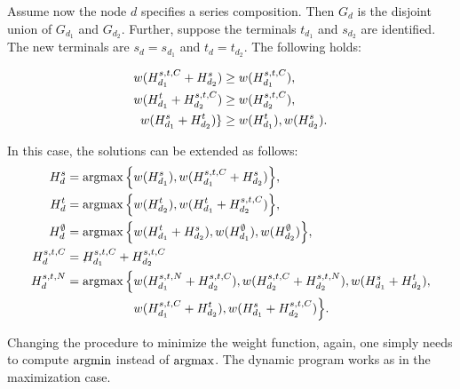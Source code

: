 Assume now the node $d$ specifies a series composition. Then $G_d$ is the disjoint union of $G_{d_1}$ and $G_{d_2}$. Further, suppose the terminals $t_{d_1}$ and $s_{d_2}$ are identified. The new terminals are $s_d = s_{d_1}$ and $t_d = t_{d_2}$. The following holds:

\begin{align}
	\label{equ:spseries}
	\begin{split}
		w(H_{d_1}^{s,t,C} + H_{d_2}^{s}) &\geq w(H_{d_1}^{s,t,C}),\\
		w(H_{d_1}^{t} + H_{d_2}^{s,t,C}) &\geq w(H_{d_2}^{s,t,C}),\\
		w(H_{d_1}^{s} + H_{d_2}^{t}) \} &\geq w(H_{d_1}^{t}), w(H_{d_2}^{s}).
	\end{split}
\end{align}

In this case, the solutions can be extended as follows:
\begin{equation}
	\label{equ:seriesupdate}
		\begin{alignedat}{4}
		\HSSP{d}{s} &= \argmax \Big\{ &&w(\HSSP{d_1}{s}), w(\HSSP{d_1}{s,t,C} + \HSSP{d_2}{s}) \Big\}, \\
		\HSSP{d}{t} &= \argmax \Big\{ &&w(\HSSP{d_2}{t}), w(\HSSP{d_1}{t} + \HSSP{d_2}{s,t,C}) \Big\}, \\
		\HSSP{d}{\emptyset} &= \argmax \Big\{ &&w(\HSSP{d_1}{t} + \HSSP{d_2}{s}), w(\HSSP{d_1}{\emptyset}), w(\HSSP{d_2}{\emptyset}) \Big\}, \\
		\HSSP{d}{s,t,C} &= \rlap{$\HSSP{d_1}{s,t,C} + \HSSP{d_2}{s,t,C}$},\\
		\HSSP{d}{s,t,N} &= \argmax \Big\{ &&w(\HSSP{d_1}{s,t,N} + \HSSP{d_2}{s,t,C}), w(\HSSP{d_2}{s,t,C} + \HSSP{d_2}{s,t,N}), w(\HSSP{d_1}{s} + \HSSP{d_2}{t}), \\
		& &&w(\HSSP{d_1}{s,t,C} + \HSSP{d_2}{t}), w(\HSSP{d_1}{s} + \HSSP{d_2}{s,t,C}) \Big\}.\\
	\end{alignedat}
\end{equation}

Changing the procedure to minimize the weight function, again, one simply needs to compute $\operatorname*{argmin}$ instead of $\operatorname*{argmax}$. The dynamic program works as in the maximization case.

